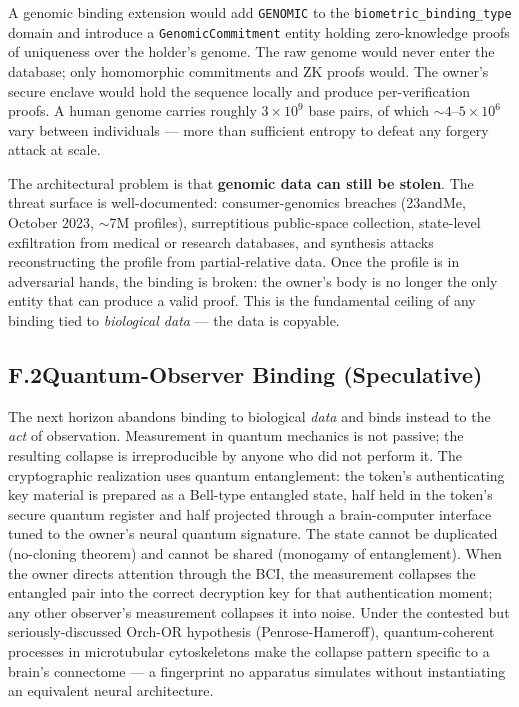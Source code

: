 \documentclass[11pt,letterpaper]{article}
\newcommand{\entity}[1]{\texttt{\color{navydark}#1}}
\begin{document}
A genomic binding extension would add \texttt{GENOMIC} to the \texttt{biometric\_binding\_type} domain and introduce a \entity{GenomicCommitment} entity holding zero-knowledge proofs of uniqueness over the holder's genome. The raw genome would never enter the database; only homomorphic commitments and ZK proofs would. The owner's secure enclave would hold the sequence locally and produce per-verification proofs. A human genome carries roughly $3 \times 10^9$ base pairs, of which $\sim 4{\text{--}}5 \times 10^6$ vary between individuals --- more than sufficient entropy to defeat any forgery attack at scale.

The architectural problem is that \textbf{genomic data can still be stolen}. The threat surface is well-documented: consumer-genomics breaches (23andMe, October 2023, $\sim$7M profiles), surreptitious public-space collection, state-level exfiltration from medical or research databases, and synthesis attacks reconstructing the profile from partial-relative data. Once the profile is in adversarial hands, the binding is broken: the owner's body is no longer the only entity that can produce a valid proof. This is the fundamental ceiling of any binding tied to \textit{biological data} --- the data is copyable.

\subsection*{F.2\quad Quantum-Observer Binding (Speculative)}

The next horizon abandons binding to biological \textit{data} and binds instead to the \textit{act} of observation. Measurement in quantum mechanics is not passive; the resulting collapse is irreproducible by anyone who did not perform it. The cryptographic realization uses quantum entanglement: the token's authenticating key material is prepared as a Bell-type entangled state, half held in the token's secure quantum register and half projected through a brain-computer interface tuned to the owner's neural quantum signature. The state cannot be duplicated (no-cloning theorem) and cannot be shared (monogamy of entanglement). When the owner directs attention through the BCI, the measurement collapses the entangled pair into the correct decryption key for that authentication moment; any other observer's measurement collapses it into noise. Under the contested but seriously-discussed Orch-OR hypothesis (Penrose-Hameroff), quantum-coherent processes in microtubular cytoskeletons make the collapse pattern specific to a brain's connectome --- a fingerprint no apparatus simulates without instantiating an equivalent neural architecture.
\end{document}
